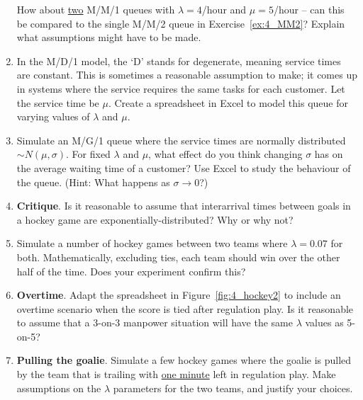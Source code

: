 \begin{enumerate}[label={4.\arabic*},leftmargin=1cm]
		How about \underline{two} M/M/1 queues with $\lambda = 4$/hour and $\mu = 5$/hour -- can this be compared to the single M/M/2 queue in Exercise~\ref{ex:4_MM2}?
		Explain what assumptions might have to be made.
	\item In the M/D/1 model, the `D' stands for degenerate, meaning service times are constant.
		This is sometimes a reasonable assumption to make; it comes up in systems where the service requires the same tasks for each customer.
		Let the service time be $\mu$.
		Create a spreadsheet in Excel to model this queue for varying values of $\lambda$ and $\mu$.
	\item Simulate an M/G/1 queue where the service times are normally distributed $\sim N(\mu,\sigma)$.
		For fixed $\lambda$ and $\mu$, what effect do you think changing $\sigma$ has on the average waiting time of a customer?
		Use Excel to study the behaviour of the queue.
		(Hint: What happens as $\sigma \rightarrow 0$?)
	\item \textbf{Critique}. Is it reasonable to assume that interarrival times between goals in a hockey game are exponentially-distributed?
		Why or why not?
	\item Simulate a number of hockey games between two teams where $\lambda = 0.07$ for both.
		Mathematically, excluding ties, each team should win over the other half of the time.
		Does your experiment confirm this?
	\item \textbf{Overtime}. Adapt the spreadsheet in Figure~\ref{fig:4_hockey2} to include an overtime scenario when the score is tied after regulation play.
		Is it reasonable to assume that a 3-on-3 manpower situation will have the same $\lambda$ values as 5-on-5?
	\item \textbf{Pulling the goalie}. Simulate a few hockey games where the goalie is pulled by the team that is trailing with \underline{one minute} left in regulation play.
		Make assumptions on the $\lambda$ parameters for the two teams, and justify your choices.
\end{enumerate}

